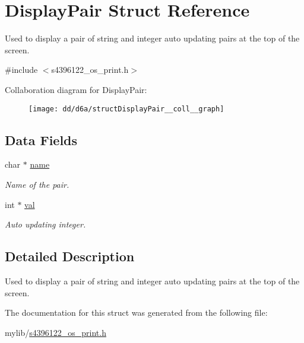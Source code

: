 \hypertarget{structDisplayPair}{}\section{Display\+Pair Struct Reference}
\label{structDisplayPair}


Used to display a pair of string and integer auto updating pairs at the top of the screen.  




{\ttfamily \#include $<$s4396122\+\_\+os\+\_\+print.\+h$>$}



Collaboration diagram for Display\+Pair\+:\nopagebreak
\begin{figure}[H]
\begin{center}
\leavevmode
\texttt{[image: dd/d6a/structDisplayPair\_\_coll\_\_graph]}
\end{center}
\end{figure}
\subsection*{Data Fields}
\begin{DoxyCompactItemize}
\item 
char $\ast$ \hyperlink{structDisplayPair_a68cc65bc310b262e70eb42b1ecdc2e2d}{name}\hypertarget{structDisplayPair_a68cc65bc310b262e70eb42b1ecdc2e2d}{}\label{structDisplayPair_a68cc65bc310b262e70eb42b1ecdc2e2d}

\begin{DoxyCompactList}\small\item\em Name of the pair. \end{DoxyCompactList}\item 
int $\ast$ \hyperlink{structDisplayPair_abf7b6c359eea9f363705d4c2c8a13ddc}{val}\hypertarget{structDisplayPair_abf7b6c359eea9f363705d4c2c8a13ddc}{}\label{structDisplayPair_abf7b6c359eea9f363705d4c2c8a13ddc}

\begin{DoxyCompactList}\small\item\em Auto updating integer. \end{DoxyCompactList}\end{DoxyCompactItemize}


\subsection{Detailed Description}
Used to display a pair of string and integer auto updating pairs at the top of the screen. 

The documentation for this struct was generated from the following file\+:\begin{DoxyCompactItemize}
\item 
mylib/\hyperlink{s4396122__os__print_8h}{s4396122\+\_\+os\+\_\+print.\+h}\end{DoxyCompactItemize}
